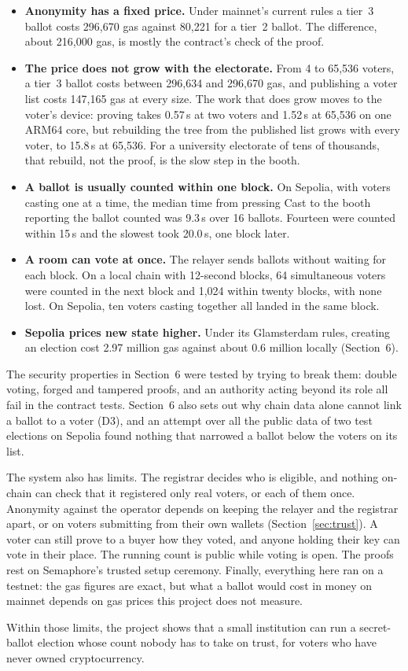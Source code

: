 \begin{itemize}
  \item \textbf{Anonymity has a fixed price.} Under mainnet's current rules a
        tier~3 ballot costs 296,670 gas against 80,221 for a tier~2 ballot.
        The difference, about 216,000 gas, is mostly the contract's check of
        the proof.
  \item \textbf{The price does not grow with the electorate.} From 4 to 65,536
        voters, a tier~3 ballot costs between 296,634 and 296,670 gas, and
        publishing a voter list costs 147,165 gas at every size. The work that
        does grow moves to the voter's device: proving takes 0.57\,s at two
        voters and 1.52\,s at 65,536 on one ARM64 core, but rebuilding the
        tree from the published list grows with every voter, to 15.8\,s at
        65,536. For a university electorate of tens of thousands, that rebuild,
        not the proof, is the slow step in the booth.
  \item \textbf{A ballot is usually counted within one block.} On Sepolia,
        with voters casting one at a time, the median time from pressing Cast
        to the booth reporting the ballot counted was 9.3\,s over 16 ballots.
        Fourteen were counted within 15\,s and the slowest took 20.0\,s, one
        block later.
  \item \textbf{A room can vote at once.} The relayer sends ballots without
        waiting for each block. On a local chain with 12-second blocks, 64
        simultaneous voters were counted in the next block and 1,024 within
        twenty blocks, with none lost. On Sepolia, ten voters casting together
        all landed in the same block.
  \item \textbf{Sepolia prices new state higher.} Under its Glamsterdam rules,
        creating an election cost 2.97 million gas against about 0.6 million
        locally (Section~6).
\end{itemize}

The security properties in Section~6 were tested by trying to break them:
double voting, forged and tampered proofs, and an authority acting beyond its
role all fail in the contract tests. Section~6 also sets out why chain data
alone cannot link a ballot to a voter (D3), and an attempt over all the public
data of two test elections on Sepolia found nothing that narrowed a ballot
below the voters on its list.

The system also has limits. The registrar decides who is eligible, and nothing
on-chain can check that it registered only real voters, or each of them once.
Anonymity against the operator depends on keeping the relayer and the
registrar apart, or on voters submitting from their own wallets
(Section~\ref{sec:trust}). A voter can
still prove to a buyer how they voted, and anyone holding their key can vote
in their place. The running count is public while voting is open. The proofs
rest on Semaphore's trusted setup ceremony. Finally, everything here ran on a
testnet: the gas figures are exact, but what a ballot would cost in money on
mainnet depends on gas prices this project does not measure.

Within those limits, the project shows that a small institution can run a
secret-ballot election whose count nobody has to take on trust, for voters
who have never owned cryptocurrency.
